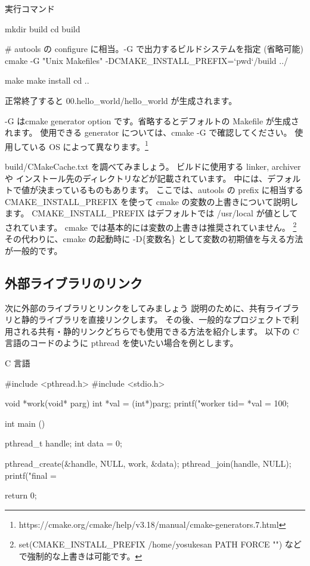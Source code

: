 \documentclass[mingoth,a4paper]{jsarticle}
\begin{document}
\vspace{1em}
実行コマンド
\begin{commandline}
mkdir build
cd build

# autools の configure に相当。-G で出力するビルドシステムを指定 (省略可能)
cmake -G "Unix Makefiles" -DCMAKE_INSTALL_PREFIX=`pwd`/build ../

make
make install
cd ..
\end{commandline}
正常終了すると 00.hello\_world/hello\_world が生成されます。

-G はcmake generator option です。省略するとデフォルトの Makefile が生成されます。
使用できる generator については、cmake -G で確認してください。
使用している OS によって異なります。\footnote{https://cmake.org/cmake/help/v3.18/manual/cmake-generators.7.html}

build/CMakeCache.txt を調べてみましょう。
ビルドに使用する linker, archiver や インストール先のディレクトリなどが記載されています。
中には、デフォルトで値が決まっているものもあります。
ここでは、autools の \-\-prefix に相当する CMAKE\_INSTALL\_PREFIX を使って cmake の変数の上書きについて説明します。
CMAKE\_INSTALL\_PREFIX はデフォルトでは /usr/local が値としてされています。
cmake では基本的には変数の上書きは推奨されていません。 \footnote{set(CMAKE\_INSTALL\_PREFIX /home/yosukesan PATH FORCE "") などで強制的な上書きは可能です。}
その代わりに、cmake の起動時に -D\{変数名\} として変数の初期値を与える方法が一般的です。

\subsection{外部ライブラリのリンク}

次に外部のライブラリとリンクをしてみましょう
説明のために、共有ライブラリと静的ライブラリを直接リンクします。
その後、一般的なプロジェクトで利用される共有・静的リンクどちらでも使用できる方法を紹介します。
以下の C 言語のコードのように pthread を使いたい場合を例とします。

\vspace{1em}
C 言語
\begin{commandline}
#include <pthread.h>
#include <stdio.h>

void *work(void* parg){
    int *val = (int*)parg;
    printf("worker tid=%
    *val = 100;
}

int main (){
    pthread_t handle; 
    int data = 0;

    pthread_create(&handle, NULL, work, &data);    
    pthread_join(handle, NULL);
    printf("final = %

    return 0;
}
\end{commandline}
\end{document}
